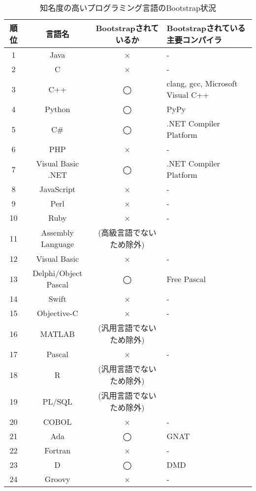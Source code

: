\begin{table}[hb]
    \begin{center}
        \caption{知名度の高いプログラミング言語のBootstrap状況}
        \begin{tabular}{|c|c|c|m{4.5cm}|}
            \hline
            順位 & 言語名 & Bootstrapされているか & Bootstrapされている主要コンパイラ \\
            \hline
            1 & Java & × & - \\
            \hline
            2 & C & × & - \\
            \hline
            3 & C++ & ◯ & clang, gcc, Microsoft Visual C++ \\
            \hline
            4 & Python & ◯ & PyPy \\
            \hline
            5 & C\# & ◯ & .NET Compiler Platform \\
            \hline
            6 & PHP & × & - \\
            \hline
            7 & Visual Basic .NET & ◯ & .NET Compiler Platform \\
            \hline
            8 & JavaScript & × & - \\
            \hline
            9 & Perl & × & - \\
            \hline
            10 & Ruby & × & - \\
            \hline
            11 & Assembly Language & (高級言語でないため除外) & \\
            \hline
            12 & Visual Basic & × & - \\
            \hline
            13 & Delphi/Object Pascal & ◯ & Free Pascal \\
            \hline
            14 & Swift & × & - \\
            \hline
            15 & Objective-C & × & - \\
            \hline
            16 & MATLAB & (汎用言語でないため除外) & \\
            \hline
            17 & Pascal & × & - \\
            \hline
            18 & R & (汎用言語でないため除外) & \\
            \hline
            19 & PL/SQL & (汎用言語でないため除外) & \\
            \hline
            20 & COBOL & × & - \\
            \hline
            21 & Ada & ◯ & GNAT \\
            \hline
            22 & Fortran & × & - \\
            \hline
            23 & D & ◯ & DMD \\
            \hline
            24 & Groovy & × & - \\
            \hline
        \end{tabular}
        \label{table:bootstrapping-languages}
    \end{center}
\end{table}


